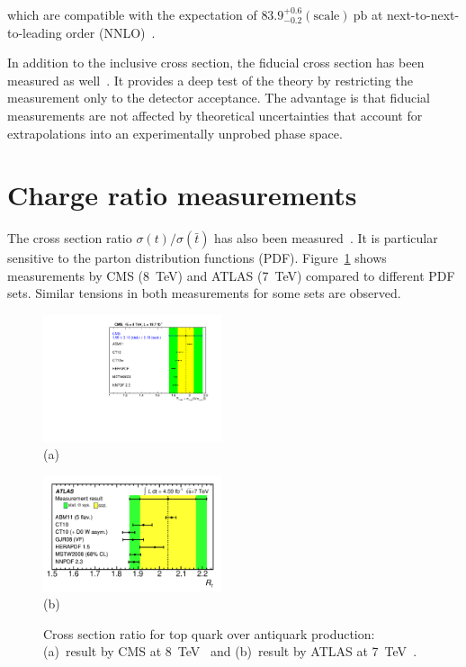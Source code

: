 \documentclass{PoS}
\begin{document}
which are compatible with the expectation of $83.9_{-0.2}^{+0.6}\mathrm{(scale)}~\mathrm{pb}$ at next-to-next-to-leading order (NNLO)~\cite{Brucherseifer-xsec8}.

In addition to the inclusive cross section, the fiducial cross section has been measured as well~\cite{atlas-xsec8,CMS-PAS-TOP-15-007}. It provides a deep test of the theory by restricting the measurement only to the detector acceptance. The advantage is that fiducial measurements are not affected by theoretical uncertainties that account for extrapolations into an experimentally unprobed phase space.





\section{Charge ratio measurements}
The cross section ratio $\sigma(t)/\sigma(\bar{t})$ has also been measured~\cite{cms-xsec8,atlas-charge7}. It is particular sensitive to the parton distribution functions (PDF). Figure~\ref{fig:charge-ratio} shows measurements by CMS (8~TeV) and ATLAS (7~TeV) compared to different PDF sets. Similar tensions in both measurements for some sets are observed. 

\begin{figure}[htbp]
\begin{center}
\parbox[t]{0.48\textwidth}{\centering\includegraphics[width=0.47\textwidth]{cms_xsec8/charge.pdf}\\(a)}
\parbox[t]{0.48\textwidth}{\centering\includegraphics[width=0.47\textwidth]{atlas_charge7/charge.pdf}\\(b)}
\end{center}
\caption{\label{fig:charge-ratio}Cross section ratio for top quark over antiquark production: (a)~result by CMS at 8~TeV~\cite{cms-xsec8} and (b)~result by ATLAS at 7~TeV~\cite{atlas-charge7}.}

\end{figure}
\end{document}
